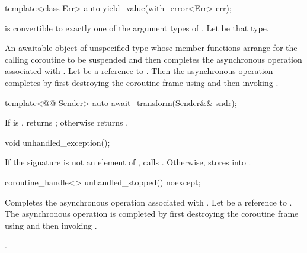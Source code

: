 %
\begin{itemdecl}
template<class Err>
  auto yield_value(with_error<Err> err);
\end{itemdecl}
\begin{itemdescr}
\pnum
\mandates
{} is convertible to exactly one of the
 argument types of .
Let  be that type.

\pnum
\returns
An awaitable object of unspecified type whose
member functions arrange for the calling coroutine to be suspended
and then completes the asynchronous operation associated with
.
Let  be a reference to .
Then the asynchronous operation completes by first
destroying the coroutine frame using 
and then invoking
.
\end{itemdescr}

%
\begin{itemdecl}
template<@@ Sender>
  auto await_transform(Sender&& sndr);
\end{itemdecl}
\begin{itemdescr}
\pnum
\returns
If 
is ,
returns ;
otherwise returns .
\end{itemdescr}

%
\begin{itemdecl}
void unhandled_exception();
\end{itemdecl}
\begin{itemdescr}
\pnum
\effects
If the signature  is not an element
of , calls .
Otherwise, stores  into
.
\end{itemdescr}

%
\begin{itemdecl}
coroutine_handle<> unhandled_stopped() noexcept;
\end{itemdecl}
\begin{itemdescr}
\pnum
\effects
Completes the asynchronous operation associated with .
Let  be a reference to .
The asynchronous operation is completed by first
destroying the coroutine frame
using  and then
invoking .
\end{itemdescr}
\begin{itemdescr}
\pnum
\returns
{}.
\end{itemdescr}

